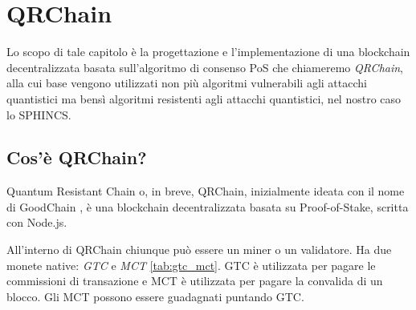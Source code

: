\chapter{QRChain}
Lo scopo di tale capitolo è la progettazione e l'implementazione di una blockchain decentralizzata basata sull'algoritmo di consenso PoS che chiameremo \textit{QRChain}, alla cui base vengono utilizzati non più algoritmi vulnerabili agli attacchi quantistici ma bensì algoritmi resistenti agli attacchi quantistici, nel nostro caso lo SPHINCS.

\section{Cos'è QRChain?}
Quantum Resistant Chain o, in breve, QRChain, inizialmente ideata con il nome di GoodChain \cite{Ghorbanzadeh_GoodChain_2022}, è una blockchain decentralizzata basata su Proof-of-Stake, scritta con Node.js.

All'interno di QRChain chiunque può essere un miner o un validatore. Ha due monete native: \textit{GTC} e \textit{MCT} \ref{tab:gtc_mct}. GTC è utilizzata per pagare le commissioni di transazione e MCT è utilizzata per pagare la convalida di un blocco. Gli MCT possono essere guadagnati puntando GTC.

\begin{table}[]
  \caption{GTC e MCT}
  \label{tab:gtc_mct}
\end{table}

